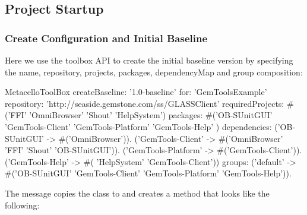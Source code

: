 \documentclass[a4paper,10pt,twoside]{book}
\begin{document}
\subsection{Project Startup}

\subsubsection{Create Configuration and Initial Baseline}
Here we use the toolbox API to create the initial baseline version by specifying the name, repository, projects, packages, dependencyMap and group composition:

\begin{code}{}
  MetacelloToolBox
    createBaseline: '1.0-baseline'
    for: 'GemToolsExample'
    repository: 'http://seaside.gemstone.com/ss/GLASSClient'
    requiredProjects: #('FFI' 'OmniBrowser' 'Shout' 'HelpSystem')
    packages: #('OB-SUnitGUI' 'GemTools-Client' 'GemTools-Platform' 'GemTools-Help' )
    dependencies:
      {('OB-SUnitGUI' -> #('OmniBrowser')).
      ('GemTools-Client' -> #('OmniBrowser' 'FFI' 'Shout' 'OB-SUnitGUI')).
      ('GemTools-Platform' -> #('GemTools-Client')).
      ('GemTools-Help' -> #( 'HelpSystem' 'GemTools-Client'))}
    groups:
      {('default' -> #('OB-SUnitGUI' 'GemTools-Client' 'GemTools-Platform' 'GemTools-Help'))}.
\end{code}            
            
The  message copies the class  to  and creates a  method that looks like the following:
\end{document}
